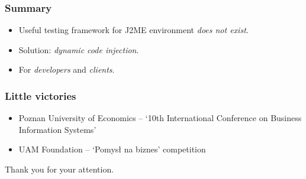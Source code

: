 \documentclass[compress]{beamer}
\begin{document}
\begin{frame}[plain]
    \frametitle{Summary}
    
    \begin{itemize}
        \item Useful testing framework for J2ME environment \emph{does not exist}.
        \item Solution: \emph{dynamic code injection}.
        \item For \emph{developers} and \emph{clients}.
    \end{itemize}
\end{frame}

\begin{frame}[plain]
    \frametitle{Little victories}
    
    \begin{itemize}
        \item Poznan University of Economics -- `10th International Conference on Business Information Systems'
        \item UAM Foundation -- `Pomysł na biznes' competition
    \end{itemize}
\end{frame}

\begin{frame}[plain]
	\begin{center}
	Thank you for your attention.
	\end{center}
\end{frame}
\end{document}
